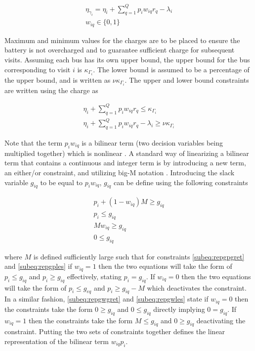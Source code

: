 \documentclass[letterpaper, 10pt, conference]{IEEEtran}
\begin{document}
\begin{subequations}
\begin{align}
    \eta_{\gamma_i} = \eta_i + \sum_{q=1}^Q p_i w_{iq} r_q - \lambda_i \\
    w_{iq} \in \{0,1\}
\end{align}
\end{subequations}

Maximum and minimum values for the charges are to be placed to ensure the battery is not overcharged and to guarantee sufficient charge for subsequent visits. Assuming each bus has its own upper bound, the upper bound for the bus corresponding to visit $i$ is $\kappa_{\Gamma_i}$. The lower bound is assumed to be a percentage of the upper bound, and is written as $\nu \kappa_{\Gamma_i}$. The upper and lower bound constraints are written using the charge as

\begin{subequations}
\begin{align}
    \eta_i + \sum_{q=1}^Q p_i w_{iq} r_q \leq \kappa_{\Gamma_i}                 \\
    \eta_i + \sum_{q=1}^Q p_i w_{iq} r_q - \lambda_i \geq \nu \kappa_{\Gamma_i}
\end{align}
\end{subequations}

Note that the term $p_i w_{iq}$ is a bilinear term (two decision variables being multiplied together) which is nonlinear \cite{Rodriguez2013}. A standard way of linearizing a bilinear term that contains a continuous and integer term is by introducing a new term, an either/or constraint, and utilizing big-M notation \cite{Chen2010,Rodriguez2013}. Introducing the slack variable $g_{iq}$ to be equal to $p_i w_{iq}$, $g_{iq}$ can be define using the following constraints

\begin{subequations}
\begin{align}
    p_i + (1 - w_{iq})M \geq g_{iq}  \label{subeq:repgpgret} \\
    p_i \leq g_{iq}                 \label{subeq:repgples} \\
    Mw_{iq} \geq g_{iq}              \label{subeq:repgwgret} \\
    0 \leq g_{iq}                   \label{subeq:repgwles}
\end{align}
\end{subequations}

\noindent
where $M$ is defined sufficiently large such that for constraints \eqref{subeq:repgpgret} and \eqref{subeq:repgples} if $w_{iq} = 1$ then the two equations will take the form of $p_i \leq g_{iq}$ and $p_i \geq g_{iq}$ effectively, stating $p_i = g_{iq}$. If $w_{iq} = 0$ then the two equations will take the form of $p_i \leq g_{eq}$ and $p_i \geq g_{iq} - M$ which deactivates the constraint. In a similar fashion, \eqref{subeq:repgwgret} and \eqref{subeq:repgwles} state if $w_{iq} = 0$ then the constraints take the form $0 \geq g_{iq}$ and $0 \leq g_{iq}$ directly implying $0 = g_{iq}$. If $w_{iq} = 1$ then the constraints take the form $M \leq g_{iq}$ and $0 \geq g_{iq}$ deactivating the constraint. Putting the two sets of constraints together defines the linear representation of the bilinear term $w_{iq} p_i$.
\end{document}
